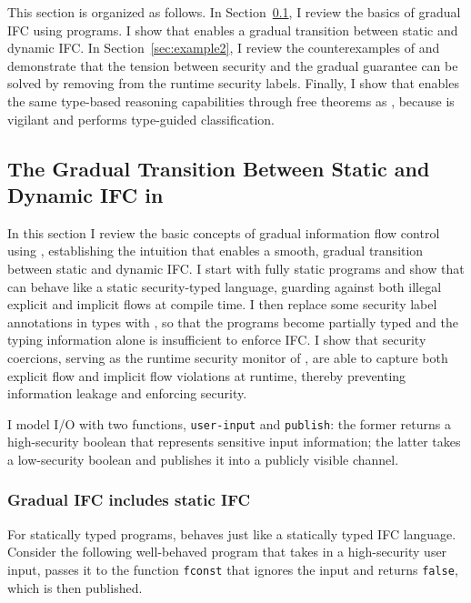 This section is organized as follows. In Section~\ref{sec:example1}, I review
the basics of gradual IFC using \Surface programs. I show that \Surface enables
a gradual transition between static and dynamic IFC. In
Section~\ref{sec:example2}, I review the counterexamples of
\textcite{Toro:2018aa} and demonstrate that the tension between security and the
gradual guarantee can be solved by removing \unk from the runtime security
labels. Finally, I show that \Surface enables the same type-based reasoning
capabilities through free theorems as \GSLRef, because \Surface is vigilant and
performs type-guided classification.

\subsection{The Gradual Transition Between Static and Dynamic IFC in \Surface}
\label{sec:example1}

In this section I review the basic concepts of gradual information flow control
using \Surface, establishing the intuition that \Surface enables a smooth,
gradual transition between static and dynamic IFC. I start with fully static
\Surface programs and show that \Surface can behave like a static security-typed
language, guarding against both illegal explicit and implicit flows at compile
time. I then replace some security label annotations in types with \unk, so that
the programs become partially typed and the typing information alone is
insufficient to enforce IFC. I show that security coercions, serving as the
runtime security monitor of \Surface, are able to capture both explicit flow and
implicit flow violations at runtime, thereby preventing information leakage and
enforcing security.

I model I/O with two functions, \texttt{user-input} and \texttt{publish}: the
former returns a high-security boolean that represents sensitive input
information; the latter takes a low-security boolean and publishes it into a
publicly visible channel.

\subsubsection{Gradual IFC includes static IFC}

For statically typed programs, \Surface behaves just like a statically
typed IFC language. Consider the following well-behaved \Surface
program that takes in a high-security user input, passes it to the
function \texttt{fconst} that ignores the input and
returns \texttt{false}, which is then published.

